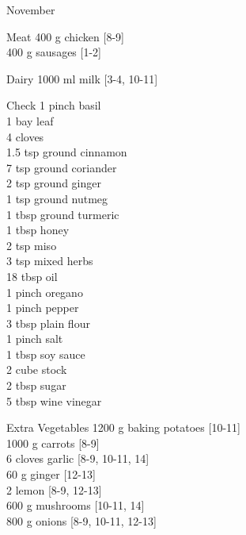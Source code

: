 \begin{menu}{November}
\begin{shoppinglist}{Meat}
      400 g chicken {\scriptsize[8-9]}\\
      400 g sausages {\scriptsize[1-2]}\\
      \end{shoppinglist}%
      \begin{shoppinglist}{Dairy}
      1000 ml milk {\scriptsize[3-4, 10-11]}\\
      \end{shoppinglist}%
      \par\vfil %
      \vfil\clearpage %
      \begin{shoppinglist}{Check}
      1 pinch basil \\
      1  bay leaf \\
      4  cloves \\
      1.5 tsp ground cinnamon \\
      7 tsp ground coriander \\
      2 tsp ground ginger \\
      1 tsp ground nutmeg \\
      1 tbsp ground turmeric \\
      1 tbsp honey \\
      2 tsp miso \\
      3 tsp mixed herbs \\
      18 tbsp oil \\
      1 pinch oregano \\
      1 pinch pepper \\
      3 tbsp plain flour \\
      1 pinch salt \\
      1 tbsp soy sauce \\
      2 cube stock \\
      2 tbsp sugar \\
      5 tbsp wine vinegar \\
      \end{shoppinglist}%
      \begin{shoppinglist}{Extra Vegetables}
      1200 g baking potatoes {\scriptsize[10-11]}\\
      1000 g carrots {\scriptsize[8-9]}\\
      6 cloves garlic {\scriptsize[8-9, 10-11, 14]}\\
      60 g ginger {\scriptsize[12-13]}\\
      2  lemon {\scriptsize[8-9, 12-13]}\\
      600 g mushrooms {\scriptsize[10-11, 14]}\\
      800 g onions {\scriptsize[8-9, 10-11, 12-13]}\\
      \end{shoppinglist}%
      \par\vfil %
    \vfil\clearpage
  

\end{menu}
